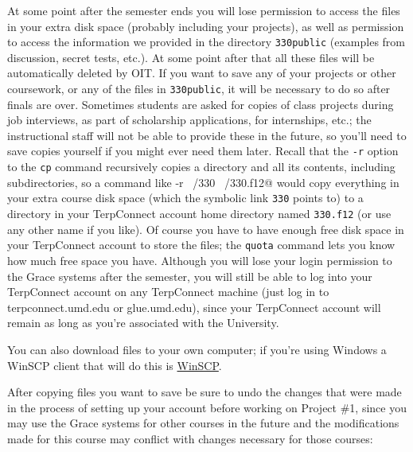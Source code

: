 \documentclass[11pt]{article}
\begin{document}
    At some point after the semester ends you will lose permission to access
  the files in your extra disk space (probably including your projects), as
  well as permission to access the information we provided in the directory
  \texttt{330public} (examples from discussion, secret tests, etc.).  At
  some point after that all these files will be automatically deleted by
  OIT.  If you want to save any of your projects or other coursework, or any
  of the files in \texttt{330public}, it will be necessary to do so after
  finals are over.  Sometimes students are asked for copies of class
  projects during job interviews, as part of scholarship applications, for
  internships, etc.; the instructional staff will not be able to provide
  these in the future, so you'll need to save copies yourself if you might
  ever need them later.  Recall that the \texttt{-r} option to the
  \texttt{cp} command recursively copies a directory and all its contents,
  including subdirectories, so a command like \verb@cp -r ~/330 ~/330.f12@
  would copy everything in your extra course disk space (which the symbolic
  link \texttt{330} points to) to a directory in your TerpConnect account
  home directory named \texttt{330.f12} (or use any other name if you like).
  Of course you have to have enough free disk space in your TerpConnect
  account to store the files; the \texttt{quota} command lets you know how
  much free space you have.  Although you will lose your login permission to
  the Grace systems after the semester, you will still be able to log into
  your TerpConnect account on any TerpConnect machine (just log in to
  terpconnect.umd.edu or glue.umd.edu), since your TerpConnect account will
  remain as long as you're associated with the University.

    You can also download files to your own computer; if you're using
  Windows a WinSCP client that will do this is
    \href{http://winscp.net/eng/index.php}
         {WinSCP}.

    After copying files you want to save be sure to undo the changes that were
  made in the process of setting up your account before working on Project
  \#1, since you may use the Grace systems for other courses in the future
  and the modifications made for this course may conflict with changes
  necessary for those courses:

    \vspace{-2.5mm}
\end{document}
